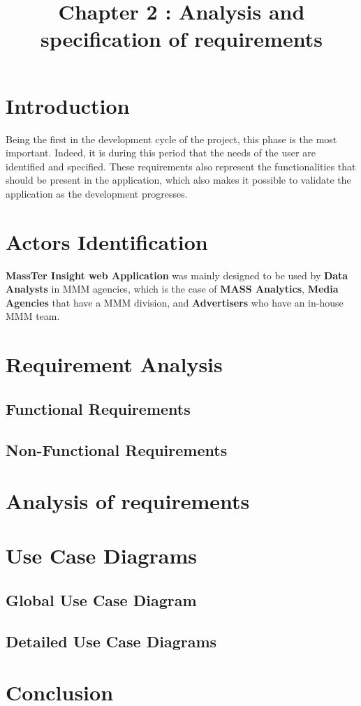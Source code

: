 \documentclass[12pt]{article}
\begin{document}
	\listoffigures
	\title{Chapter 2 : Analysis and specification of requirements}
	\maketitle
	
	\section{Introduction}
	Being the first in the development cycle of the project, this phase is the most
	important. Indeed, it is during this period that the needs of the user are identified and specified. These requirements also represent the functionalities that should be present in the application, which also makes it possible to validate the application as the development progresses.
	\section{Actors Identification}
	\textbf{MassTer Insight web Application }was mainly designed to be used by \textbf{Data Analysts }in MMM agencies, which is the case of \textbf{MASS Analytics}, \textbf{Media Agencies }that have a MMM division, and \textbf{Advertisers }who have an in-house MMM team.
	\section{Requirement Analysis}
	\subsection{Functional Requirements}
	\subsection{Non-Functional Requirements}
	\section{Analysis of requirements}
	\section{Use Case Diagrams}
	\subsection{Global Use Case Diagram}
	\subsection{Detailed Use Case Diagrams}
	\section{Conclusion}
	
\end{document}
